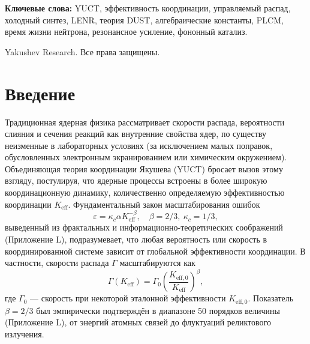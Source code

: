 \documentclass[12pt]{article}
\theoremstyle{remark}
\newcommand{\Keff}{K_{\mathrm{eff}}}
\newcommand{\Keffzero}{K_{\mathrm{eff},0}}
\begin{document}
\begin{titlepage}
\begin{center}
			\vspace{0.3cm}
			
			\noindent
			\small\textbf{Ключевые слова:} YUCT, эффективность координации, управляемый распад, холодный синтез, LENR, теория DUST, алгебраические константы, PLCM, время жизни нейтрона, резонансное усиление, фононный катализ.
			
			\vspace{0.1cm}
			
			\noindent
			 Yakushev Research. Все права защищены.
		\end{center}
	\end{titlepage}
	
	\tableofcontents
	\newpage
	
	\section{Введение}
	\label{sec:intro}
	
	Традиционная ядерная физика рассматривает скорости распада, вероятности слияния и сечения реакций как внутренние свойства ядер, по существу неизменные в лабораторных условиях (за исключением малых поправок, обусловленных электронным экранированием или химическим окружением). Объединяющая теория координации Якушева (YUCT) бросает вызов этому взгляду, постулируя, что ядерные процессы встроены в более широкую координационную динамику, количественно определяемую эффективностью координации \(\Keff\). Фундаментальный закон масштабирования ошибок
	\begin{equation}
		\varepsilon = \kappa_c \alpha \Keff^{-\beta}, \quad \beta = 2/3,\ \kappa_c = 1/3,
		\label{eq:universal-scaling}
	\end{equation}
	выведенный из фрактальных и информационно-теоретических соображений (Приложение L), подразумевает, что любая вероятность или скорость в координированной системе зависит от глобальной эффективности координации. В частности, скорости распада \(\Gamma\) масштабируются как
	\begin{equation}
		\Gamma(\Keff) = \Gamma_0 \left( \frac{\Keffzero}{\Keff} \right)^{\beta},
		\label{eq:decay-rate}
	\end{equation}
	где \(\Gamma_0\) — скорость при некоторой эталонной эффективности \(\Keffzero\). Показатель \(\beta = 2/3\) был эмпирически подтверждён в диапазоне 50 порядков величины (Приложение L), от энергий атомных связей до флуктуаций реликтового излучения.
	
\end{document}
